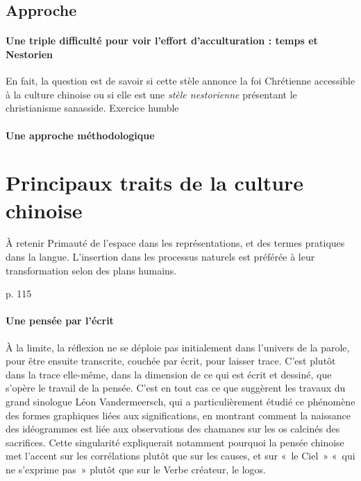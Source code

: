 \subsection{Approche}
\paragraph{Une triple difficulté pour voir l'effort d'acculturation : temps et Nestorien} En fait, la question est de savoir si cette stèle annonce la foi Chrétienne accessible à la culture chinoise ou si elle est une \textit{stèle nestorienne} présentant le christianisme sanasside. Exercice humble

\paragraph{Une approche méthodologique}



\section{Principaux traits de la culture chinoise}


\begin{Synthesis}
À retenir Primauté de l’espace dans les représentations, et des termes pratiques dans la langue. L’insertion dans les processus naturels est préférée à leur transformation selon des plans humains.
\end{Synthesis}

\cite{PolDroit:voyage} p. 115 


\paragraph{Une pensée par l'écrit} À la limite, la réflexion ne se déploie pas initialement dans l’univers de la parole, pour être ensuite transcrite, couchée par écrit, pour laisser trace. C’est plutôt dans la trace elle-même, dans la dimension de ce qui est écrit et dessiné, que s’opère le travail de la pensée. C’est en tout cas ce que suggèrent les travaux du grand sinologue Léon Vandermeersch, qui a particulièrement étudié ce phénomène des formes graphiques liées aux significations, en montrant comment la naissance des idéogrammes est liée aux observations des chamanes sur les os calcinés des sacrifices. Cette singularité expliquerait notamment pourquoi la pensée chinoise met l’accent sur les corrélations plutôt que sur les causes, et sur « le Ciel » « qui ne s’exprime pas » plutôt que sur le Verbe créateur, le logos.

